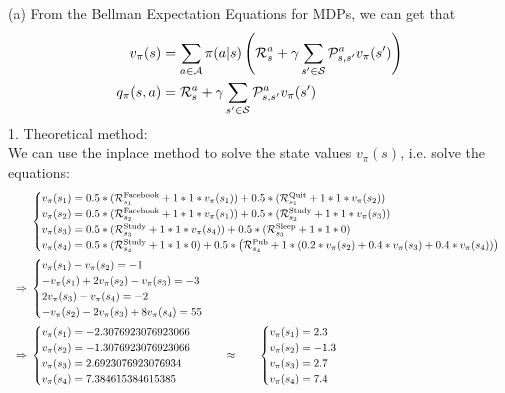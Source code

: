 \begin{homeworkProblem}
(a) From the Bellman Expectation Equations for MDPs, we can get that
\begin{align*}
v_{\pi}(s) &= \sum_{a \in \mathcal{A}}\pi(a|s)\left(\mathcal{R}_s^a + \gamma \sum_{s' \in \mathcal{S}} \mathcal{P}_{s,s'}^a v_{\pi}(s')\right) \\
q_{\pi}(s,a) &= \mathcal{R}_s^a + \gamma \sum_{s' \in \mathcal{S}} \mathcal{P}_{s,s'}^a v_{\pi}(s')
\end{align*}
1. Theoretical method: \\
We can use the inplace method to solve the state values $v_{\pi}(s)$, i.e. solve the equations:
\begin{align*}
\qquad&\begin{cases}
v_{\pi}(s_1) = 0.5 * (\mathcal{R}_{s_1}^{\text{Facebook}} + 1 * 1 * v_{\pi}(s_1)) + 0.5 *(\mathcal{R}_{s_1}^{\text{Quit}} + 1 * 1 * v_{\pi}(s_2)) \\
v_{\pi}(s_2) = 0.5 * (\mathcal{R}_{s_2}^{\text{Facebook}} + 1 * 1 * v_{\pi}(s_1)) + 0.5 *(\mathcal{R}_{s_2}^{\text{Study}} + 1 * 1 * v_{\pi}(s_3)) \\
v_{\pi}(s_3) = 0.5 * (\mathcal{R}_{s_3}^{\text{Study}} + 1 * 1 * v_{\pi}(s_4)) + 0.5 *(\mathcal{R}_{s_3}^{\text{Sleep}} + 1 * 1 * 0) \\
v_{\pi}(s_4) = 0.5 * (\mathcal{R}_{s_4}^{\text{Study}} + 1 * 1 * 0) + 0.5 * \left(\mathcal{R}_{s_4}^{\text{Pub}} + 1 * \left(0.2 * v_{\pi}(s_2) + 0.4 * v_{\pi}(s_3) + 0.4 * v_{\pi}(s_4)\right)\right)
\end{cases} \\
\Rightarrow\ &\begin{cases}
v_{\pi}(s_1) - v_{\pi}(s_2) = -1 \\
-v_{\pi}(s_1) + 2v_{\pi}(s_2) - v_{\pi}(s_3) = -3 \\
2v_{\pi}(s_3) - v_{\pi}(s_4) = -2 \\
-v_{\pi}(s_2) - 2v_{\pi}(s_3) + 8v_{\pi}(s_4) = 55
\end{cases} \\
\Rightarrow\ &\begin{cases}
v_{\pi}(s_1) = -2.3076923076923066 \\
v_{\pi}(s_2) = -1.3076923076923066 \\
v_{\pi}(s_3) = 2.6923076923076934 \\
v_{\pi}(s_4) = 7.384615384615385
\end{cases}
\qquad\approx\qquad\begin{cases}
v_{\pi}(s_1) = 2.3 \\
v_{\pi}(s_2) = -1.3 \\
v_{\pi}(s_3) = 2.7 \\
v_{\pi}(s_4) = 7.4
\end{cases}
\end{align*}


\end{homeworkProblem}
